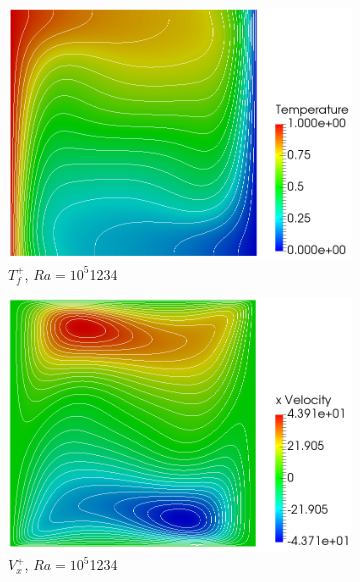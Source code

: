 \begin{figure}[!h]
\begin{subfigure}{0.32\textwidth}
  \includegraphics[width=\linewidth]{figs/Ra5_t.png}
  \caption{\(T_f^+\), \(Ra=10^5\)\color{white}1234}
    \vspace*{0.5em}
\end{subfigure}
\begin{subfigure}{0.32\textwidth}
  \centering
  \includegraphics[width=\linewidth]{figs/Ra5_u.png}
  \caption{\(V_x^+\), \(Ra=10^5\)\color{white}1234}
    \vspace*{0.5em}
\end{subfigure}
\begin{subfigure}{0.32\textwidth}
  \centering

\end{subfigure}
\end{figure}

